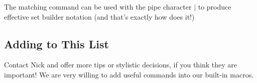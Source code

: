 {\begin{itemize}
      The matching command  can be used with the pipe character $|$ to produce effective set builder notation (and that's exactly how  does it!)
    \end{itemize}
    
  \subsection{Adding to This List}
    Contact Nick and offer more tips or stylistic decisions, if you think they are important! We are very willing to add useful commands into our built-in macros.
  
  
}
  
  
  